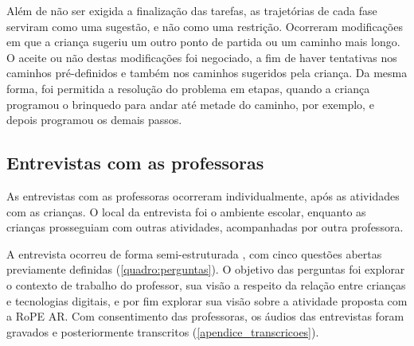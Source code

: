 Além de não ser exigida a finalização das tarefas, as trajetórias de cada fase serviram como uma sugestão, e não como uma restrição. Ocorreram modificações em que a criança sugeriu um outro ponto de partida ou um caminho mais longo. O aceite ou não destas modificações foi negociado, a fim de haver tentativas nos caminhos pré-definidos e também nos caminhos sugeridos pela criança. Da mesma forma, foi permitida a resolução do problema em etapas, quando a criança programou o brinquedo para andar até metade do caminho, por exemplo, e depois programou os demais passos.

\subsection{Entrevistas com as professoras}
As entrevistas com as professoras ocorreram individualmente, após as atividades com as crianças. O local da entrevista foi o ambiente escolar, enquanto as crianças prosseguiam com outras atividades, acompanhadas por outra professora. 

A entrevista ocorreu de forma semi-estruturada \cite{boni_aprendendo_entrevistar_2005}, com cinco questões abertas previamente definidas (\autoref{quadro:perguntas}). O objetivo das perguntas foi explorar o contexto de trabalho do professor, sua visão a respeito da relação entre crianças e tecnologias digitais, e por fim explorar sua visão sobre a atividade proposta com a RoPE AR. Com consentimento das professoras, os áudios das entrevistas foram gravados e posteriormente transcritos (\autoref{apendice_transcricoes}).

